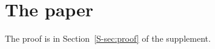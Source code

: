 \documentclass{article}
\begin{document}
\section{The paper}\label{sec:paper}
The proof is in Section~\ref{S-sec:proof} of the supplement.
\end{document}
